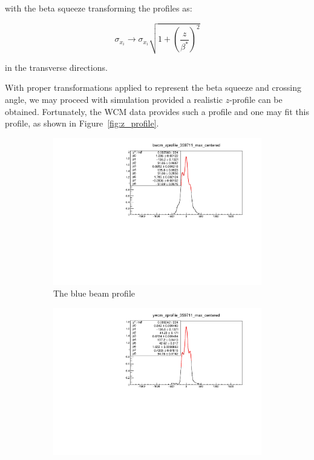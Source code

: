 {\noindent} with the beta squeeze transforming the profiles as:

\begin{equation}
\label{eq:beta_star_transform}
\sigma_{x_i} \rightarrow \sigma_{x_i} \sqrt{1+\left(\frac{z}{\beta^*}\right)^2 }
\end{equation}

{\noindent} in the transverse directions.

With proper transformations applied to represent the beta squeeze and crossing
angle, we may proceed with simulation provided a realistic $z$-profile can be
obtained. Fortunately, the WCM data provides such a profile and one may fit this
profile, as shown in Figure~\ref{fig:z_profile}.

\begin{figure}
  \centering
  \begin{subfigure}[b]{0.8\textwidth}
    \centering
    \includegraphics[width=\linewidth]{./figures/blue_zprofile_359711.pdf}
    \caption{The blue beam profile}
  \end{subfigure}
  \begin{subfigure}[b]{0.8\textwidth}
    \centering
    \includegraphics[width=\linewidth]{./figures/yell_zprofile_359711.pdf}

\end{subfigure}
\end{figure}
